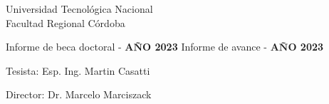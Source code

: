 \thispagestyle{empty}

\begin{center}
	\vspace*{3cm}
	
	
	\vspace{2cm}
	
	\LARGE{Universidad Tecnológica Nacional\\
		Facultad Regional Córdoba}
	
	\vspace{2cm}
	
	\ifdefined\beca
		\LARGE{Informe de beca doctoral - \textbf{AÑO 2023}}
	\else 
		\LARGE{Informe de avance - \textbf{AÑO 2023}}
	\fi 

	\vspace{2cm}
\end{center}

\begin{flushright} 
	\Large{Tesista: Esp. Ing. Martin Casatti}

	\vspace{0.3cm}
	\Large{Director: Dr. Marcelo Marciszack}
	
\end{flushright} 
